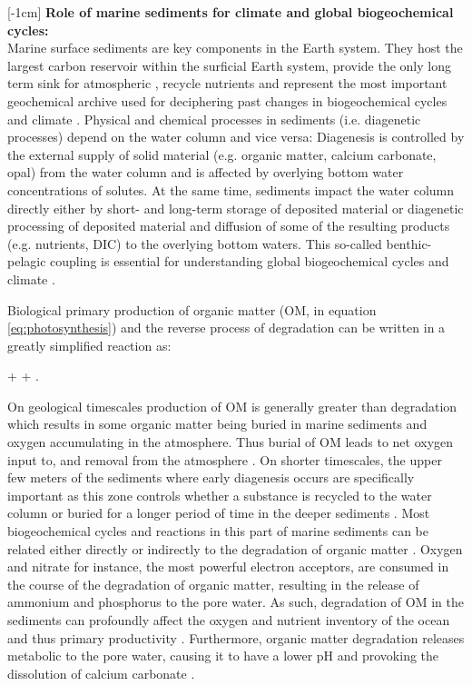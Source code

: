 \documentclass[gmd, manuscript]{copernicus}
\begin{document}
[-1cm]%
\textbf{Role of marine sediments for climate and global biogeochemical cycles:}\\
Marine surface sediments are key components in the Earth system. They host the largest carbon reservoir within the surficial Earth system, provide the only long term sink for atmospheric , 
recycle nutrients and represent the most important geochemical archive used for deciphering past changes in biogeochemical cycles and climate  \citep[e.g.][]{berner:91, archer_effect_1994, ridgwell_role_2005, arndt_quantifying_2013}. 
Physical and chemical processes in sediments (i.e. diagenetic processes) depend on the water column and vice versa: Diagenesis is controlled by the external supply of solid material 
(e.g. organic matter, calcium carbonate, opal) from the water column and is affected by overlying bottom water concentrations of solutes. 
At the same time, sediments impact the water column directly either by short- and long-term storage of deposited material or diagenetic processing of deposited material and 
diffusion of some of the resulting products (e.g. nutrients, DIC) to the overlying bottom waters. 
This so-called benthic-pelagic coupling is essential for understanding global biogeochemical cycles and climate \citep[e.g.][]{archer_effect_1994, archer_what_2000, soetaert_coupling_2000, mackenzie_sediments_2005}. 

Biological primary production of organic matter (OM,  in equation \ref{eq:photosynthesis}) and the reverse process of degradation can be written in a greatly simplified reaction as:
\begin{reaction}
+ \rightleftharpoons {} + .\label{eq:photosynthesis}
\end{reaction}
On geological timescales production of OM is generally greater than degradation which results in some organic matter being buried in marine sediments and oxygen accumulating in the atmosphere. 
Thus burial of OM leads to net oxygen input to, and  removal from the atmosphere \citep{berner_phanerozoic_2004}. 
On shorter timescales, the upper few meters of the sediments where early diagenesis occurs are specifically important as this zone controls whether a substance is recycled 
to the water column or buried for a longer period of time in the deeper sediments \citep{hensen_benthic_2006}. 
Most biogeochemical cycles and reactions in this part of marine sediments can be related either directly or indirectly to the degradation of organic matter \citep[][]{arndt_quantifying_2013}. 
Oxygen and nitrate for instance, the most powerful electron acceptors, are consumed in the course of the degradation of organic matter, resulting in the release of ammonium and phosphorus to the pore water. 
As such, degradation of OM in the sediments can profoundly affect the oxygen and nutrient inventory of the ocean and thus primary productivity \citep{van_cappellen_benthic_1994, lenton_redfield_2000}. 
Furthermore, organic matter degradation releases metabolic  to the pore water, causing it to have a lower pH and provoking the dissolution of calcium carbonate  \citep{emerson_carbon_1981}.
\end{document}
